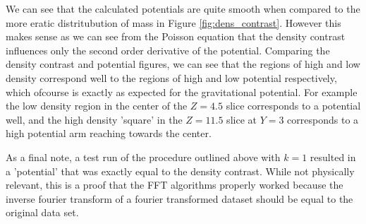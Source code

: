 We can see that the calculated potentials are quite smooth when compared to the more eratic distritubution of mass in Figure \ref{fig:dens_contrast}. However this makes sense as we can see from the Poisson equation that the density contrast influences only the second order derivative of the potential. Comparing the density contrast and potential figures, we can see that the regions of high and low density correspond well to the regions of high and low potential respectively, which ofcourse is exactly as expected for the gravitational potential. For example the low density region in the center of the $Z = 4.5$ slice corresponds to a potential well, and the high density 'square' in the $Z = 11.5$ slice at $Y = 3$ corresponds to a high potential arm reaching towards the center. 

As a final note, a test run of the procedure outlined above with $k = 1$ resulted in a 'potential' that was exactly equal to the density contrast. While not physically relevant, this is a proof that the FFT algorithms properly worked because the inverse fourier transform of a fourier transformed dataset should be equal to the original data set.

